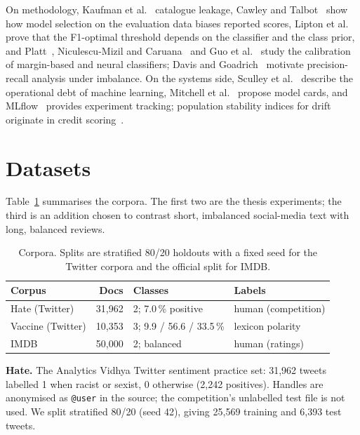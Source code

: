 \documentclass[journal,10pt]{IEEEtran}
\begin{document}
On methodology, Kaufman et al.~\cite{kaufman2012} catalogue leakage, Cawley and Talbot~\cite{cawley2010} show how model selection on the evaluation data biases reported scores, Lipton et al.~\cite{lipton2014} prove that the F1-optimal threshold depends on the classifier and the class prior, and Platt~\cite{platt1999}, Niculescu-Mizil and Caruana~\cite{niculescu2005} and Guo et al.~\cite{guo2017} study the calibration of margin-based and neural classifiers; Davis and Goadrich~\cite{davis2006} motivate precision-recall analysis under imbalance. On the systems side, Sculley et al.~\cite{sculley2015} describe the operational debt of machine learning, Mitchell et al.~\cite{mitchell2019} propose model cards, and MLflow~\cite{zaharia2018} provides experiment tracking; population stability indices for drift originate in credit scoring~\cite{siddiqi2006}.

\section{Datasets}
\label{sec:data}
Table~\ref{tab:data} summarises the corpora. The first two are the thesis experiments; the third is an addition chosen to contrast short, imbalanced social-media text with long, balanced reviews.

\begin{table}[t]
\centering
\caption{Corpora. Splits are stratified 80/20 holdouts with a fixed seed for the Twitter corpora and the official split for IMDB.}
\label{tab:data}
\footnotesize\setlength{\tabcolsep}{4pt}
\begin{tabular}{lrll}
\toprule
Corpus & Docs & Classes & Labels \\
\midrule
Hate (Twitter) & 31,962 & 2; 7.0\,\% positive & human (competition) \\
Vaccine (Twitter) & 10,353 & 3; 9.9 / 56.6 / 33.5\,\% & lexicon polarity \\
IMDB & 50,000 & 2; balanced & human (ratings) \\
\bottomrule
\end{tabular}
\end{table}

\textbf{Hate.} The Analytics Vidhya Twitter sentiment practice set: 31,962 tweets labelled 1 when racist or sexist, 0 otherwise (2,242 positives). Handles are anonymised as \texttt{@user} in the source; the competition's unlabelled test file is not used. We split stratified 80/20 (seed 42), giving 25,569 training and 6,393 test tweets.
\end{document}
